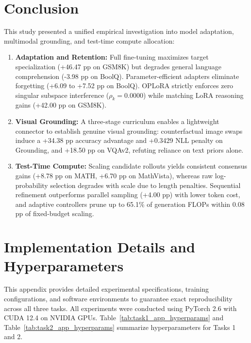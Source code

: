 \documentclass{article}
\begin{document}
\FloatBarrier
\section{Conclusion}
\label{sec:conclusion}
This study presented a unified empirical investigation into model adaptation, multimodal grounding, and test-time compute allocation:
\begin{enumerate}[leftmargin=1.5em,noitemsep,topsep=1.5pt,partopsep=0pt,parsep=0pt]
    \item \textbf{Adaptation and Retention:} Full fine-tuning maximizes target specialization (+46.47 pp on GSM8K) but degrades general language comprehension (-3.98 pp on BoolQ). Parameter-efficient adapters eliminate forgetting (+6.09 to +7.52 pp on BoolQ). OPLoRA strictly enforces zero singular subspace interference ($\rho_k = 0.0000$) while matching LoRA reasoning gains (+42.00 pp on GSM8K).
    \item \textbf{Visual Grounding:} A three-stage curriculum enables a lightweight connector to establish genuine visual grounding: counterfactual image swaps induce a +34.38 pp accuracy advantage and +0.3429 NLL penalty on Grounding, and +18.50 pp on VQAv2, refuting reliance on text priors alone.
    \item \textbf{Test-Time Compute:} Scaling candidate rollouts yields consistent consensus gains (+8.78 pp on MATH, +6.70 pp on MathVista), whereas raw log-probability selection degrades with scale due to length penalties. Sequential refinement outperforms parallel sampling (+4.00 pp) with lower token cost, and adaptive controllers prune up to 65.1\% of generation FLOPs within 0.08 pp of fixed-budget scaling.
\end{enumerate}

\FloatBarrier
\clearpage
{\small


}

\clearpage
\appendix

\section{Implementation Details and Hyperparameters}
\label{app:hyperparams}
This appendix provides detailed experimental specifications, training configurations, and software environments to guarantee exact reproducibility across all three tasks. All experiments were conducted using PyTorch 2.6 with CUDA 12.4 on NVIDIA GPUs. Table~\ref{tab:task1_app_hyperparams} and Table~\ref{tab:task2_app_hyperparams} summarize hyperparameters for Tasks 1 and 2.
\end{document}
